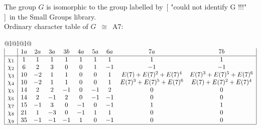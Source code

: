 \documentclass[varwidth=\maxdimen,border=10]{standalone}
\begin{document}
The group $G$ is isomorphic to the group labelled by\ [ "could not identify G !!!" ]\ in the Small Groups library.\\
Ordinary character table of $G$\ $\cong$\ A7:\\
\begin{center}
\begin{tabular}{@{}l@{}l@{}l@{}}
\hline
\(\begin{array}{|l|ccccccccc|}
  & 1a & 2a & 3a & 3b & 4a & 5a & 6a & 7a & 7b\\ \hline
\chi_{1} & 1 & 1 & 1 & 1 & 1 & 1 & 1 & 1 & 1\\
\chi_{2} & 6 & 2 & 3 & 0 & 0 & 1 & -1 & -1 & -1\\
\chi_{3} & 10 & -2 & 1 & 1 & 0 & 0 & 1 & E(7)+E(7)^{2}+E(7)^{4} & E(7)^{3}+E(7)^{5}+E(7)^{6}\\
\chi_{4} & 10 & -2 & 1 & 1 & 0 & 0 & 1 & E(7)^{3}+E(7)^{5}+E(7)^{6} & E(7)+E(7)^{2}+E(7)^{4}\\
\chi_{5} & 14 & 2 & 2 & -1 & 0 & -1 & 2 & 0 & 0\\
\chi_{6} & 14 & 2 & -1 & 2 & 0 & -1 & -1 & 0 & 0\\
\chi_{7} & 15 & -1 & 3 & 0 & -1 & 0 & -1 & 1 & 1\\
\chi_{8} & 21 & 1 & -3 & 0 & -1 & 1 & 1 & 0 & 0\\
\chi_{9} & 35 & -1 & -1 & -1 & 1 & 0 & -1 & 0 & 0\\
\hline
\end{array}\)\\
\end{tabular}
\end{center}
\end{document}
